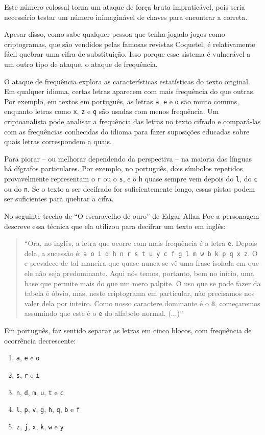 Este número colossal torna um ataque de força bruta impraticável, pois seria necessário testar um número inimaginável de chaves para encontrar a correta.

Apesar disso, como sabe qualquer pessoa que tenha jogado jogos como criptogramas, que são vendidos pelas famosas revistas Coquetel, é relativamente fácil quebrar uma cifra de substituição.
Isso porque esse sistema é vulnerável a um outro tipo de ataque, o ataque de frequência.

O ataque de frequência explora as características estatísticas do texto original.
Em qualquer idioma, certas letras aparecem com mais frequência do que outras.
Por exemplo, em textos em português, as letras {\tt a}, {\tt e} e {\tt o} são muito comuns, enquanto letras como {\tt x}, {\tt z} e {\tt q} são usadas com menos frequência.
Um criptoanalista pode analisar a frequência das letras no texto cifrado e compará-las com as frequências conhecidas do idioma para fazer suposições educadas sobre quais letras correspondem a quais.

Para piorar -- ou melhorar dependendo da perspectiva -- na maioria das línguas há dígrafos particulares.
Por exemplo, no português, dois símbolos repetidos provavelmente representam o {\tt r} ou o {\tt s}, e o {\tt h} quase sempre vem depois do {\tt l}, do {\tt c} ou do {\tt n}.
Se o texto a ser decifrado for suficientemente longo, essas pistas podem ser suficientes para quebrar a cifra.

No seguinte trecho de ``O escaravelho de ouro'' de Edgar Allan Poe a personagem descreve essa técnica que ela utilizou para decifrar um texto em inglês:

\begin{quote}
``Ora, no inglês, a letra que ocorre com mais frequência é a letra {\tt e}.
Depois dela, a sucessão é: {\tt a o i d h n r s t u y c f g l m w b k p q x z}.
O e prevalece de tal maneira que quase nunca se vê uma frase isolada em que ele não seja predominante.
Aqui nós temos, portanto, bem no início, uma base que permite mais do que um mero palpite.
O uso que se pode fazer da tabela é óbvio, mas, neste criptograma em particular, não precisamos nos valer dela por inteiro.
Como nosso caractere dominante é o {\tt 8}, começaremos assumindo que este é o {\tt e} do alfabeto normal. (...)''
\end{quote}

Em português, faz sentido separar as letras em cinco blocos, com frequência de ocorrência decrescente:
\begin{enumerate}
\item {\tt a}, {\tt e} e {\tt o}
\item {\tt s}, {\tt r} e {\tt i}
\item {\tt n}, {\tt d}, {\tt m}, {\tt u}, {\tt t} e {\tt c}
\item {\tt l}, {\tt p}, {\tt v}, {\tt g}, {\tt h}, {\tt q}, {\tt b} e {\tt f}
\item {\tt z}, {\tt j}, {\tt x}, {\tt k}, {\tt w} e {\tt y}
\end{enumerate}

